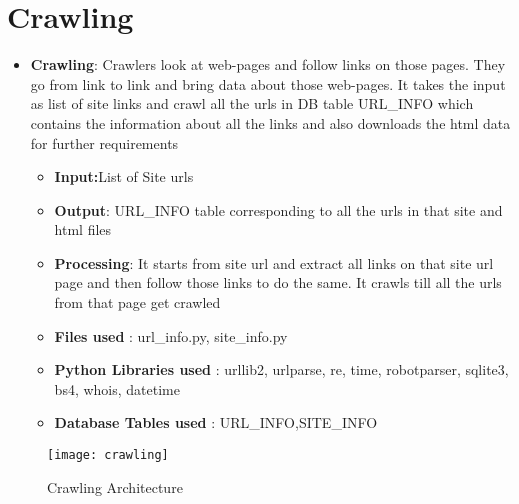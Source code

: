 \documentclass{scrreprt}
\begin{document}
\section{Crawling}
\begin{itemize}
\item\textbf{Crawling}:  Crawlers look at web-pages and follow links on those pages. They go from link to link and bring data about those web-pages. It takes the input as list of site links and crawl all the urls in DB table URL_INFO which contains the information about all the links and also downloads the html data for further requirements
    \begin{itemize}
      \item \textbf{Input:}List of Site urls
       \item\textbf{Output}: URL_INFO table corresponding to all the urls in that site and html files
       \item \textbf{Processing}: It starts from site url and extract all links on that site url page and then follow those links to do the same. It crawls till all the urls from that page get crawled
        \item \textbf{Files used} : url_info.py, site_info.py
        \item \textbf{Python Libraries used} : urllib2, urlparse, re, time, robotparser, sqlite3, bs4, whois, datetime

        
        \item \textbf{Database Tables used} : URL_INFO,SITE_INFO
        
     \end{itemize}
\end{itemize}


\begin{figure}[h]
\begin{center}
\texttt{[image: crawling]}
\caption{Crawling Architecture}
\end{center}
\end{figure}  
\end{document}
